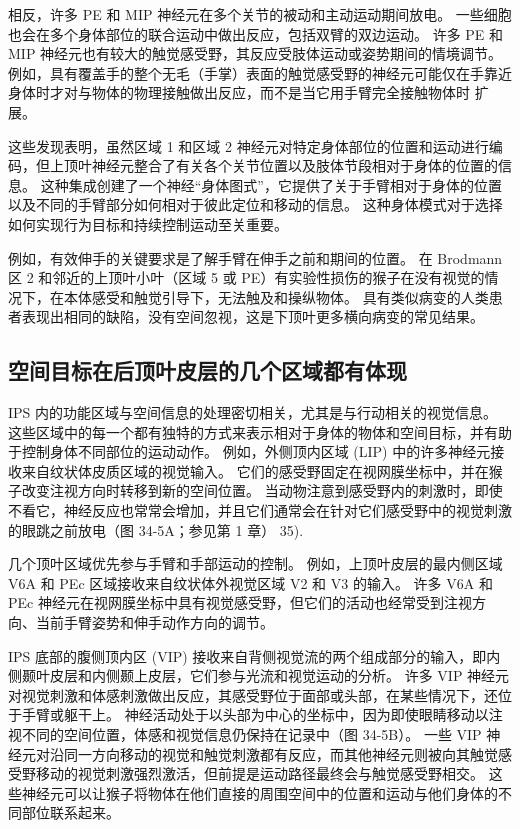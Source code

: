相反，许多 PE 和 MIP 神经元在多个关节的被动和主动运动期间放电。 一些细胞也会在多个身体部位的联合运动中做出反应，包括双臂的双边运动。 许多 PE 和 MIP 神经元也有较大的触觉感受野，其反应受肢体运动或姿势期间的情境调节。 例如，具有覆盖手的整个无毛（手掌）表面的触觉感受野的神经元可能仅在手靠近身体时才对与物体的物理接触做出反应，而不是当它用手臂完全接触物体时 扩展。

这些发现表明，虽然区域 1 和区域 2 神经元对特定身体部位的位置和运动进行编码，但上顶叶神经元整合了有关各个关节位置以及肢体节段相对于身体的位置的信息。 这种集成创建了一个神经“身体图式”，它提供了关于手臂相对于身体的位置以及不同的手臂部分如何相对于彼此定位和移动的信息。 这种身体模式对于选择如何实现行为目标和持续控制运动至关重要。

例如，有效伸手的关键要求是了解手臂在伸手之前和期间的位置。 在 Brodmann 区 2 和邻近的上顶叶小叶（区域 5 或 PE）有实验性损伤的猴子在没有视觉的情况下，在本体感受和触觉引导下，无法触及和操纵物体。 具有类似病变的人类患者表现出相同的缺陷，没有空间忽视，这是下顶叶更多横向病变的常见结果。


\subsection{空间目标在后顶叶皮层的几个区域都有体现}
IPS 内的功能区域与空间信息的处理密切相关，尤其是与行动相关的视觉信息。 这些区域中的每一个都有独特的方式来表示相对于身体的物体和空间目标，并有助于控制身体不同部位的运动动作。 例如，外侧顶内区域 (LIP) 中的许多神经元接收来自纹状体皮质区域的视觉输入。 它们的感受野固定在视网膜坐标中，并在猴子改变注视方向时转移到新的空间位置。 当动物注意到感受野内的刺激时，即使不看它，神经反应也常常会增加，并且它们通常会在针对它们感受野中的视觉刺激的眼跳之前放电（图 34-5A；参见第 1 章） 35).

几个顶叶区域优先参与手臂和手部运动的控制。 例如，上顶叶皮层的最内侧区域 V6A 和 PEc 区域接收来自纹状体外视觉区域 V2 和 V3 的输入。 许多 V6A 和 PEc 神经元在视网膜坐标中具有视觉感受野，但它们的活动也经常受到注视方向、当前手臂姿势和伸手动作方向的调节。

IPS 底部的腹侧顶内区 (VIP) 接收来自背侧视觉流的两个组成部分的输入，即内侧颞叶皮层和内侧颞上皮层，它们参与光流和视觉运动的分析。 许多 VIP 神经元对视觉刺激和体感刺激做出反应，其感受野位于面部或头部，在某些情况下，还位于手臂或躯干上。 神经活动处于以头部为中心的坐标中，因为即使眼睛移动以注视不同的空间位置，体感和视觉信息仍保持在记录中（图 34-5B）。 一些 VIP 神经元对沿同一方向移动的视觉和触觉刺激都有反应，而其他神经元则被向其触觉感受野移动的视觉刺激强烈激活，但前提是运动路径最终会与触觉感受野相交。 这些神经元可以让猴子将物体在他们直接的周围空间中的位置和运动与他们身体的不同部位联系起来。

